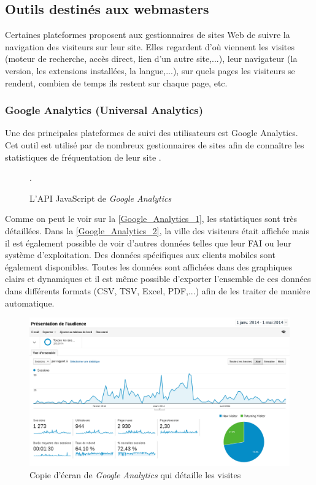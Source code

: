 \subsection{Outils destinés aux webmasters}
Certaines plateformes proposent aux gestionnaires de sites Web de suivre la navigation des visiteurs sur leur site. Elles regardent d'où viennent les visites (moteur de recherche, accès direct, lien d'un autre site,...), leur navigateur (la version, les extensions installées, la langue,...), sur quels pages les visiteurs se rendent, combien de temps ils restent sur chaque page, etc.

\subsubsection{Google Analytics (Universal Analytics)}
\label{google_analytics}
Une des principales plateformes de suivi des utilisateurs est Google Analytics. Cet outil est utilisé par de nombreux gestionnaires de sites afin de connaître les statistiques de fréquentation de leur site \cite{javascript_google_analytics}.

\begin{figure}[!h]
	\centering
	
	\caption{\label{js_google_analytics}L'API JavaScript de \textit{Google Analytics}}.
\end{figure}

Comme on peut le voir sur la \autoref{Google_Analytics_1}, les statistiques sont très détaillées. Dans la \autoref{Google_Analytics_2}, la ville des visiteurs était affichée mais il est également possible de voir d'autres données telles que leur FAI ou leur système d'exploitation. Des données spécifiques aux clients mobiles sont également disponibles. Toutes les données sont affichées dans des graphiques clairs et dynamiques et il est même possible d'exporter l'ensemble de ces données dans différents formats (CSV, TSV, Excel, PDF,...) afin de les traiter de manière automatique.
\newline

\begin{figure}[!h]
	\centering
	\includegraphics[scale=0.35]{examples/Google_Analytics_1.png}
	\caption{\label{Google_Analytics_1}Copie d'écran de \textit{Google Analytics} qui détaille les visites}
\end{figure}

